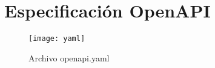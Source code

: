 \chapter{Especificación OpenAPI}\label{ap:especificacion}
\begin{figure}[h!]
	\centering
	\texttt{[image: yaml]}
	\caption{Archivo openapi.yaml}
	\label{fig:yaml}
\end{figure}

\endinput
